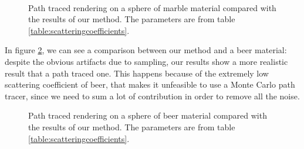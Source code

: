 \begin{figure}
{}
\\
\caption{Path traced rendering on a sphere of marble material compared with the results of our method. The parameters are from table \ref{table:scatteringcoefficients}.}
\label{fig:pathmarble}
\end{figure}

\FloatBarrier
In figure \ref{fig:pathbeer}, we can see a comparison between our method and a beer material: despite the obvious artifacts due to sampling, our results show a more realistic result that a path traced one. This happens because of the extremely low scattering coefficient of beer, that makes it unfeasible to use a Monte Carlo path tracer, since we need to sum a lot of contribution in order to remove all the noise. 

\begin{figure}[!ht]
\centering
{}
\caption{Path traced rendering on a sphere of beer material compared with the results of our method. The parameters are from table \ref{table:scatteringcoefficients}.}
\label{fig:pathbeer}
\end{figure}

